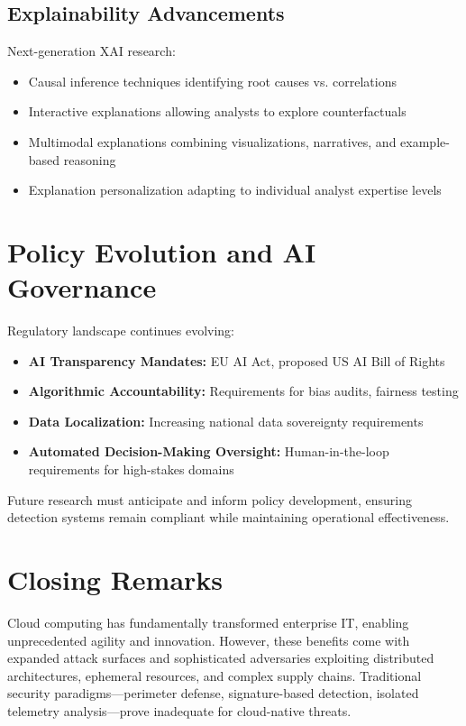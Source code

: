 \subsection{Explainability Advancements}
Next-generation XAI research:
\begin{itemize}
    \item Causal inference techniques identifying root causes vs. correlations
    \item Interactive explanations allowing analysts to explore counterfactuals
    \item Multimodal explanations combining visualizations, narratives, and example-based reasoning
    \item Explanation personalization adapting to individual analyst expertise levels
\end{itemize}

\section{Policy Evolution and AI Governance}\label{sec:conclusion-policy-future}
Regulatory landscape continues evolving:
\begin{itemize}
    \item \textbf{AI Transparency Mandates:} EU AI Act, proposed US AI Bill of Rights
    \item \textbf{Algorithmic Accountability:} Requirements for bias audits, fairness testing
    \item \textbf{Data Localization:} Increasing national data sovereignty requirements
    \item \textbf{Automated Decision-Making Oversight:} Human-in-the-loop requirements for high-stakes domains
\end{itemize}

Future research must anticipate and inform policy development, ensuring detection systems remain compliant while maintaining operational effectiveness.

\section{Closing Remarks}\label{sec:conclusion-closing}
Cloud computing has fundamentally transformed enterprise IT, enabling unprecedented agility and innovation. However, these benefits come with expanded attack surfaces and sophisticated adversaries exploiting distributed architectures, ephemeral resources, and complex supply chains. Traditional security paradigms—perimeter defense, signature-based detection, isolated telemetry analysis—prove inadequate for cloud-native threats.

